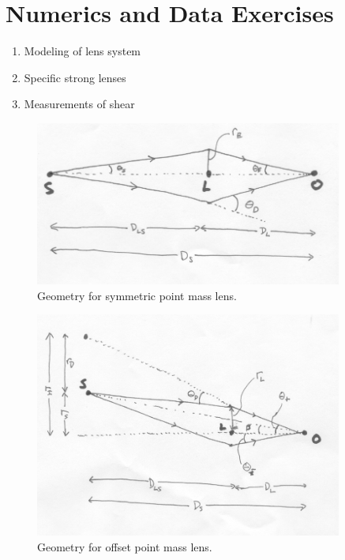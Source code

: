 \section{Numerics and Data Exercises}

\begin{enumerate}
\item Modeling of lens system
\item Specific strong lenses
\item Measurements of shear
\end{enumerate}


  

\begin{figure}
\includegraphics[width=0.9\textwidth]{figures/symmetric_lens.jpg}
\caption{\label{fig:symmetric} Geometry for symmetric point mass lens.}
\end{figure}

\begin{figure}
\includegraphics[width=0.9\textwidth]{figures/offset_lens.jpg}
\caption{\label{fig:offset} Geometry for offset point mass lens.}
\end{figure}
